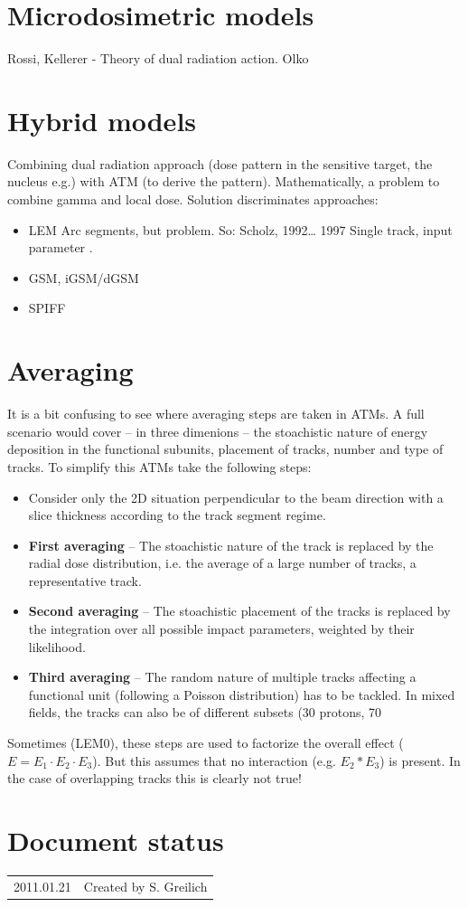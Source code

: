 \section{Microdosimetric models}
Rossi, Kellerer - Theory of dual radiation action.
Olko

\section{Hybrid models}
Combining dual radiation approach (dose pattern in the sensitive target, the
nucleus e.g.) with ATM (to derive the pattern). Mathematically, a problem to
combine gamma and local dose. Solution discriminates approaches:
\begin{itemize}
  \item{LEM Arc segments, but problem. So: Scholz, 1992\ldots{} 1997 Single
  track, input parameter \cite{Geiss_et_al_1997, Bassler_et_al_2008}.}
  \item{GSM, iGSM/dGSM}
  \item{SPIFF}
\end{itemize}

\section{Averaging}
It is a bit confusing to see where averaging steps are taken in ATMs. A full
scenario would cover -- in three dimenions -- the stoachistic nature of energy
deposition in the functional subunits, placement of tracks, number and type of tracks. To
simplify this ATMs take the following steps:
\begin{itemize}
  \item Consider only the 2D situation perpendicular to the beam direction with
  a slice thickness according to the track segment regime.
  \item \textbf{First averaging} -- The stoachistic nature of the track is
  replaced by the radial dose distribution, i.e. the average of a large
  number of tracks, a representative track.
  \item \textbf{Second averaging} -- The stoachistic placement of the tracks is
  replaced by the integration over all possible impact parameters, weighted by
  their likelihood.
  \item \textbf{Third averaging} -- The random nature of multiple tracks
  affecting a functional unit (following a Poisson distribution) has to be
  tackled. In mixed fields, the tracks can also be of different subsets (30%
  protons, 70%
\end{itemize}
Sometimes (LEM0), these steps are used to factorize the overall effect
($E=E_1\cdot E_2\cdot E_3$). But this assumes that no interaction (e.g.
$E_2\ast E_3$) is present. In the case of overlapping tracks
this is clearly not true!


\section*{Document status}
\begin{tabular}{l l}
2011.01.21&Created by S. Greilich
\end{tabular} 